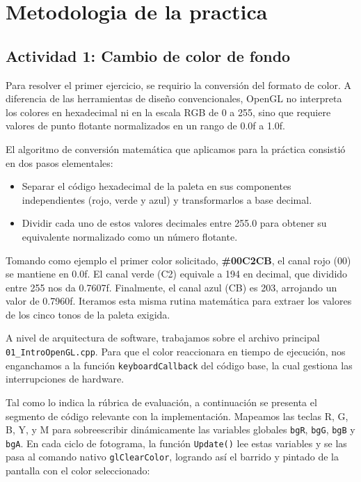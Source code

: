 \section{Metodologia de la practica}

\subsection{Actividad 1: Cambio de color de fondo}

Para resolver el primer ejercicio, se requirio la conversión del formato de color. A diferencia de las herramientas de diseño convencionales, OpenGL no interpreta los colores en hexadecimal ni en la escala RGB de 0 a 255, sino que requiere valores de punto flotante normalizados en un rango de 0.0f a 1.0f.

El algoritmo de conversión matemática que aplicamos para la práctica consistió en dos pasos elementales:
\begin{itemize}
    \item Separar el código hexadecimal de la paleta en sus componentes independientes (rojo, verde y azul) y transformarlos a base decimal.
    \item Dividir cada uno de estos valores decimales entre 255.0 para obtener su equivalente normalizado como un número flotante.
\end{itemize}

Tomando como ejemplo el primer color solicitado, \textbf{\#00C2CB}, el canal rojo (00) se mantiene en 0.0f. El canal verde (C2) equivale a 194 en decimal, que dividido entre 255 nos da 0.7607f. Finalmente, el canal azul (CB) es 203, arrojando un valor de 0.7960f. Iteramos esta misma rutina matemática para extraer los valores de los cinco tonos de la paleta exigida.

A nivel de arquitectura de software, trabajamos sobre el archivo principal \texttt{01\_IntroOpenGL.cpp}. Para que el color reaccionara en tiempo de ejecución, nos enganchamos a la función \texttt{keyboardCallback} del código base, la cual gestiona las interrupciones de hardware.

Tal como lo indica la rúbrica de evaluación, a continuación se presenta el segmento de código relevante con la implementación. Mapeamos las teclas R, G, B, Y, y M para sobreescribir dinámicamente las variables globales \texttt{bgR}, \texttt{bgG}, \texttt{bgB} y \texttt{bgA}. En cada ciclo de fotograma, la función \texttt{Update()} lee estas variables y se las pasa al comando nativo \texttt{glClearColor}, logrando así el barrido y pintado de la pantalla con el color seleccionado:\\

